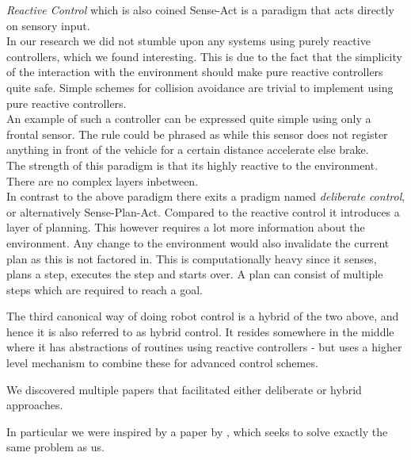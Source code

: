 \textit{Reactive Control} which is also coined Sense-Act is a paradigm that acts directly on sensory input.\\
In our research we did not stumble upon any systems using purely reactive controllers, which we found interesting. This is due to the fact that the simplicity of the interaction with the environment should make pure reactive controllers quite safe.
Simple schemes for collision avoidance are trivial to implement using pure reactive controllers.\\
An example of such a controller can be expressed quite simple using only a frontal sensor. The rule could be phrased as while this sensor does not register anything in front of the vehicle for a certain distance accelerate else brake.\\
The strength of this paradigm is that its highly reactive to the environment. There are no complex layers inbetween.\\

In contrast to the above paradigm there exits a pradigm named \textit{deliberate control}, or alternatively Sense-Plan-Act.
Compared to the reactive control it introduces a layer of planning.
This however requires a lot more information about the environment.
Any change to the environment would also invalidate the current plan as this is not factored in.
This is computationally heavy since it senses, plans a step, executes the step and starts over.
A plan can consist of multiple steps which are required to reach a goal.

The third canonical way of doing robot control is a hybrid of the two above, and hence it is also referred to as hybrid control.
It resides somewhere in the middle where it has abstractions of routines using reactive controllers - but uses a higher level mechanism to combine these for advanced control schemes.

We discovered multiple papers that facilitated either deliberate or hybrid approaches.

In particular we were inspired by a paper by \cite{texas}, which seeks to solve exactly the same problem as us.